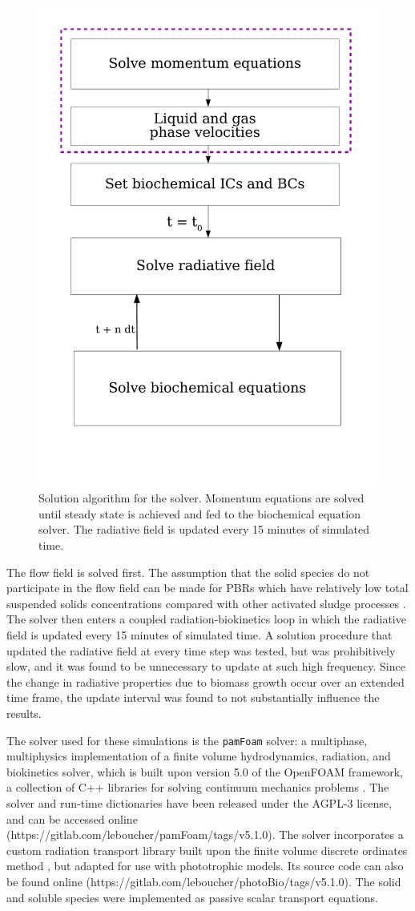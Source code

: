 \begin{figure}[tp]
\centering
\includegraphics[width=0.6\linewidth]{Images/Chap3/algo_devt.pdf}
\caption{Solution algorithm for the solver. Momentum equations are solved until steady state is achieved and fed to the biochemical equation solver. The radiative field is updated every 15 minutes of simulated time.}
\label{fig:solnHierarchy}
\end{figure}

The flow field is solved first. The assumption that the solid species do not participate in the flow field can be made for PBRs which have relatively low total suspended solids concentrations compared with other activated sludge processes \cite{bitog2011}. The solver then enters a coupled radiation-biokinetics loop in which the radiative field is updated every 15 minutes of simulated time. A solution procedure that updated the radiative field at every time step was tested, but was prohibitively slow, and it was found to be unnecessary to update at such high frequency. Since the change in radiative properties due to biomass growth occur over an extended time frame, the update interval was found to not substantially influence the results.
\skippingparagraph

The solver used for these simulations is the \texttt{pamFoam} solver: a multiphase, multiphysics implementation of a finite volume hydrodynamics, radiation, and biokinetics solver, which is built upon version 5.0 of the OpenFOAM framework, a collection of C++ libraries for solving continuum mechanics problems \cite{theopenfoamfoundation2017}. The solver and run-time dictionaries have been released under the AGPL-3 license, and can be accessed online (https://gitlab.com/leboucher/pamFoam/tags/v5.1.0). The solver incorporates a custom radiation transport library built upon the finite volume discrete ordinates method \cite{raithby1990}, but adapted for use with phototrophic models. Its source code can also be found online (https://gitlab.com/leboucher/photoBio/tags/v5.1.0). The solid and soluble species were implemented as passive scalar transport equations.


